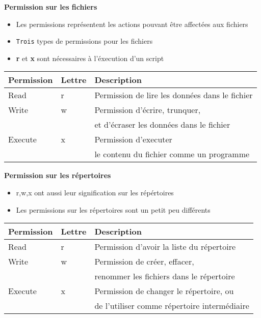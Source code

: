 \documentclass[french]{beamer}
\begin{document}
\begin{frame}
\textbf{Permission sur les fichiers}
\begin{itemize}
\item Les permissions représentent les actions pouvant être affectées aux fichiers
\item \texttt{Trois} types de permissions pour les fichiers
\item \textbf{r} et \textbf{x} sont nécessaires à l'éxecution d'un script
\end{itemize}
\begin{tabular}{|l|l|l|}
   \hline
   \textbf{Permission} & \textbf{Lettre} & \textbf{Description} \\
   \hline
   Read & r & Permission de lire les données dans le fichier \\
   Write & w & Permission d'écrire, trunquer,\\ 
   & & et d'écraser les données dans le fichier \\
   Execute & x & Permission d'executer \\
   & & le contenu du fichier comme un programme\\
   \hline
\end{tabular}
\end{frame}

\begin{frame}
\textbf{Permission sur les répertoires}
    \begin{itemize}
    \item r,w,x ont aussi leur signification sur les répértoires
    \item Les permissions sur les répertoires sont un petit peu différents
\end{itemize}
\begin{tabular}{|l|l|l|}
    \hline
    \textbf{Permission} & \textbf{Lettre} & \textbf{Description} \\
    \hline
    Read & r & Permission d'avoir la liste du répertoire \\
    Write & w & Permission de créer, effacer,\\ 
    & & renommer les fichiers dans le répertoire \\
    Execute & x & Permission de changer le répertoire, ou  \\
    & & de l'utiliser comme répertoire intermédiaire \\
    \hline
\end{tabular}
\end{frame}
\end{document}
